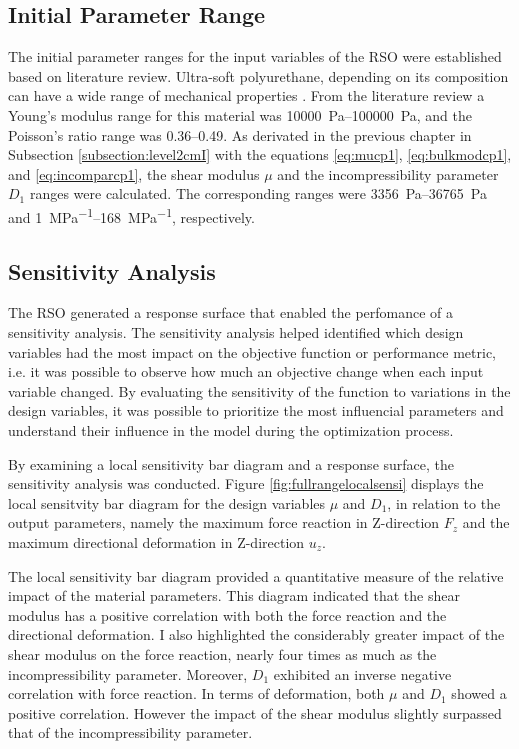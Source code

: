 \subsection*{Initial Parameter Range}
The initial parameter ranges for the input variables of the RSO were established based on literature review.
Ultra-soft polyurethane, depending on its composition can have a wide range of mechanical properties \cite{Wendels2021}.
From the literature review a Young's modulus range for this material was \SIrange{10000}{100000}{\pascal}, and the 
Poisson's ratio range was \SIrange{0.36}{0.49}{}. As derivated in the previous chapter in 
Subsection \ref{subsection:level2cmI} with the equations \ref{eq:mucp1}, \ref{eq:bulkmodcp1}, 
and \ref{eq:incomparcp1}, the shear modulus $\mu$ and the incompressibility parameter $D_1$ ranges were calculated.
The corresponding ranges were \SIrange{3356}{36765}{\pascal} and \SIrange{1}{168}{\mega\pascal\tothe{-1}}, respectively.

\subsection*{Sensitivity Analysis}
The RSO generated a response surface that enabled the perfomance of a sensitivity analysis.
The sensitivity analysis helped identified which design variables had the most impact 
on the objective function or performance metric, i.e. it was possible to observe how much 
an objective change when each input variable changed. By evaluating the sensitivity of the 
function to variations in the design variables, it was possible to prioritize the most 
influencial parameters and understand their influence in the model during the optimization 
process.

By examining a local sensitivity bar diagram and a response surface, the sensitivity analysis was conducted.
Figure \ref{fig:fullrangelocalsensi} displays the local sensitvity bar diagram for the design variables
$\mu$ and $D_1$, in relation to the output parameters, namely the maximum force reaction in Z-direction $F_z$ 
and the maximum directional deformation in Z-direction $u_z$. 

The local sensitivity bar diagram provided a quantitative measure of the relative impact of the material 
parameters. This diagram indicated that the shear modulus has a positive correlation with both the force
reaction and the directional deformation. I also highlighted the considerably greater impact of the shear modulus 
on the force reaction, nearly four times as much as the incompressibility parameter. Moreover, $D_1$ exhibited 
an inverse negative correlation with force reaction.
In terms of deformation, both $\mu$ and $D_1$ showed a positive correlation. However the impact of the 
shear modulus slightly surpassed that of the incompressibility parameter.\\

